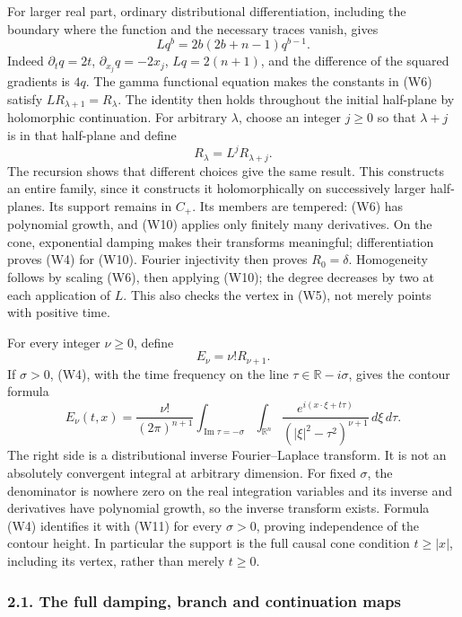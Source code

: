\documentclass[
  11pt,
]{article}
\begin{document}
For larger real part, ordinary distributional differentiation, including
the boundary where the function and the necessary traces vanish, gives
\[
 Lq^b=2b(2b+n-1)q^{b-1}.
 \tag{W9}
\] Indeed \(\partial_tq=2t\), \(\partial_{x_j}q=-2x_j\), \(Lq=2(n+1)\),
and the difference of the squared gradients is \(4q\). The gamma
functional equation makes the constants in (W6) satisfy
\(LR_{\lambda+1}=R_\lambda\). The identity then holds throughout the
initial half-plane by holomorphic continuation. For arbitrary
\(\lambda\), choose an integer \(j\geq0\) so that \(\lambda+j\) is in
that half-plane and define \[
                       R_\lambda=L^jR_{\lambda+j}.
 \tag{W10}
\] The recursion shows that different choices give the same result. This
constructs an entire family, since it constructs it holomorphically on
successively larger half-planes. Its support remains in \(C_+\). Its
members are tempered: (W6) has polynomial growth, and (W10) applies only
finitely many derivatives. On the cone, exponential damping makes their
transforms meaningful; differentiation proves (W4) for (W10). Fourier
injectivity then proves \(R_0=\delta\). Homogeneity follows by scaling
(W6), then applying (W10); the degree decreases by two at each
application of \(L\). This also checks the vertex in (W5), not merely
points with positive time.

For every integer \(\nu\geq0\), define \[
                              E_\nu=\nu!R_{\nu+1}.
 \tag{W11}
\] If \(\sigma>0\), (W4), with the time frequency on the line
\(\tau\in\mathbb R-i\sigma\), gives the contour formula \[
 E_\nu(t,x)=\frac{\nu!}{(2\pi)^{n+1}}
 \int_{\operatorname{Im}\tau=-\sigma}\int_{\mathbb R^n}
 \frac{e^{i(x\cdot\xi+t\tau)}}{(|\xi|^2-\tau^2)^{\nu+1}}
 \,d\xi\,d\tau.
 \tag{W12}
\] The right side is a distributional inverse Fourier--Laplace
transform. It is not an absolutely convergent integral at arbitrary
dimension. For fixed \(\sigma\), the denominator is nowhere zero on the
real integration variables and its inverse and derivatives have
polynomial growth, so the inverse transform exists. Formula (W4)
identifies it with (W11) for every \(\sigma>0\), proving independence of
the contour height. In particular the support is the full causal cone
condition \(t\geq|x|\), including its vertex, rather than merely
\(t\geq0\).

\subsubsection{2.1. The full damping, branch and continuation
maps}\label{the-full-damping-branch-and-continuation-maps}
\end{document}
